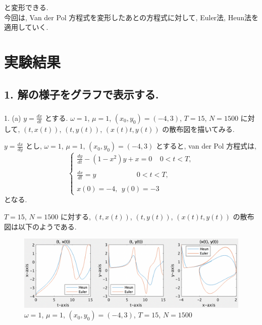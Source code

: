 \documentclass[11pt]{jsarticle}
\begin{document}
と変形できる. \\
今回は, Van der Pol 方程式を変形したあとの方程式に対して, Euler法, Heun法を適用していく. 


\clearpage
\section{実験結果}
\subsection{1. 解の様子をグラフで表示する. }

\subsubsection{}
\begin{itembox}[l]{1. (a)}
$\displaystyle y = \frac{dx}{dt}$ とする. $\omega = 1$, $\mu = 1$, $(x_{0}, y_{0}) = (-4, 3)$, $T = 15$, $N = 1500$ に対して, $(t, x(t))$, $(t, y(t))$, $(x(t)t, y(t))$ の散布図を描いてみる. 
\end{itembox}

$\displaystyle y = \frac{dx}{dy}$ とし, $\omega = 1$, $\mu = 1$, $(x_{0}, y_{0}) = (-4, 3)$ とすると, van der Pol 方程式は, 
\[
\left\{
\begin{array}{l}
\displaystyle \frac{dy}{dt} - (1 - x^{2})y + x = 0 \ \ \ \ \ 0 < t < T, \\
\ \\
\displaystyle \frac{dx}{dt} = y\ \ \ \ \ \ \ \ \ \ \ \ \ \ \ \ \ \ \ \ \ \ \ \ \ \ 0 < t < T, \\
\ \\
\displaystyle x(0) = -4 ,\ \ y(0) = -3
\end{array}
\right.
\]
となる. 

$T = 15$, $N = 1500$ に対する, $(t, x(t))$, $(t, y(t))$, $(x(t)t, y(t))$ の散布図は以下のようである. 
\begin{figure}[htbp]
\centering
\includegraphics[width=15cm]{images/1_a_1*.png}
\caption{$\omega = 1$, $\mu = 1$, $(x_{0}, y_{0}) = (-4, 3)$, $T = 15$, $N = 1500$}
\end{figure}
\end{document}
